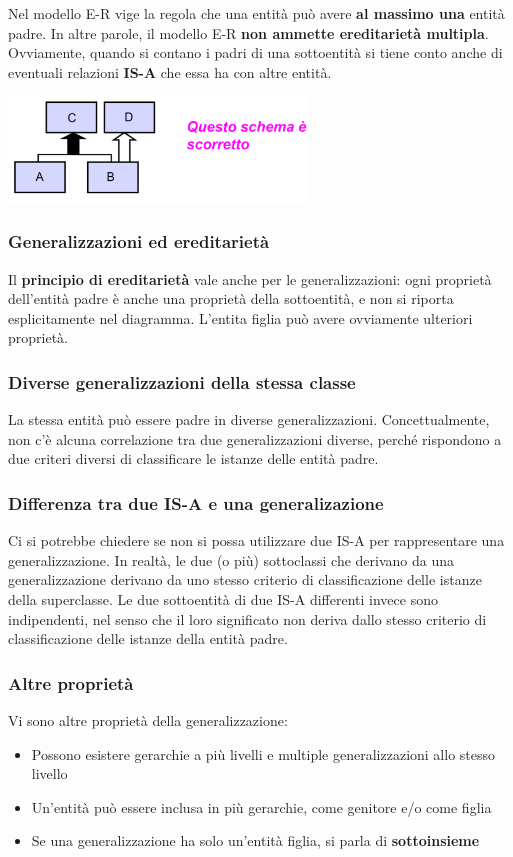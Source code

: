 \documentclass[12pt]{article}
\begin{document}
Nel modello E-R vige la regola che una entità può avere \textbf{al massimo una} entità padre. In altre parole, il modello E-R \textbf{non ammette ereditarietà multipla}.
Ovviamente, quando si contano i padri di una sottoentità si tiene conto anche di eventuali relazioni \textbf{IS-A} che essa ha con altre entità.
\begin{center}
    \includegraphics[width = 0.60\textwidth]{Images/38.PNG}
\end{center}
\subsubsection{Generalizzazioni ed ereditarietà}
Il \textbf{principio di ereditarietà} vale anche per le generalizzazioni: ogni proprietà dell'entità padre è anche una proprietà della sottoentità, e non si riporta esplicitamente nel diagramma.
L'entita figlia può avere ovviamente ulteriori proprietà.
\subsubsection{Diverse generalizzazioni della stessa classe}
La stessa entità può essere padre in diverse generalizzazioni.
Concettualmente, non c'è alcuna correlazione tra due generalizzazioni diverse, perché rispondono a due criteri diversi di classificare le istanze delle entità padre.
\subsubsection{Differenza tra due IS-A e una generalizazione}
Ci si potrebbe chiedere se non si possa utilizzare due IS-A per rappresentare una generalizzazione.
In realtà, le due (o più) sottoclassi che derivano da una generalizzazione derivano da uno stesso criterio di classificazione delle istanze della superclasse.
Le due sottoentità di due IS-A differenti invece sono indipendenti, nel senso che il loro significato non deriva dallo stesso criterio di classificazione delle istanze della entità padre.
\subsubsection{Altre proprietà}
Vi sono altre proprietà della generalizzazione:
\begin{itemize}
    \item Possono esistere gerarchie a più livelli e multiple generalizzazioni allo stesso livello
    \item Un'entità può essere inclusa in più gerarchie, come genitore e/o come figlia
    \item Se una generalizzazione ha solo un'entità figlia, si parla di \textbf{sottoinsieme}
\end{itemize}
\end{document}
